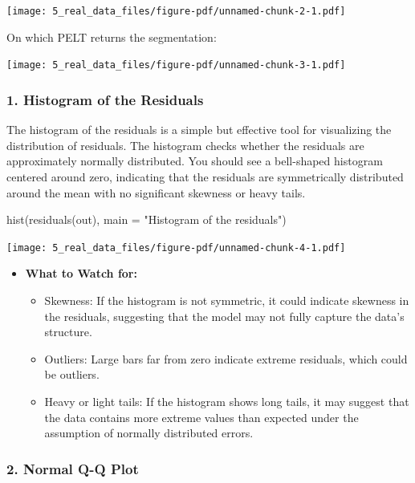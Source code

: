 \documentclass[
  letterpaper,
  DIV=11,
  numbers=noendperiod]{scrreprt}
\newenvironment{Shaded}{\begin{snugshade}}{\end{snugshade}}
\newcommand{\AttributeTok}[1]{\textcolor[rgb]{0.40,0.45,0.13}{#1}}
\newcommand{\FunctionTok}[1]{\textcolor[rgb]{0.28,0.35,0.67}{#1}}
\newcommand{\NormalTok}[1]{\textcolor[rgb]{0.00,0.23,0.31}{#1}}
\newcommand{\StringTok}[1]{\textcolor[rgb]{0.13,0.47,0.30}{#1}}
\providecommand{\tightlist}{%
  \setlength{\itemsep}{0pt}\setlength{\parskip}{0pt}}\usepackage{longtable,booktabs,array}
\begin{document}
\texttt{[image: 5\_real\_data\_files/figure-pdf/unnamed-chunk-2-1.pdf]}

On which PELT returns the segmentation:

\texttt{[image: 5\_real\_data\_files/figure-pdf/unnamed-chunk-3-1.pdf]}

\subsubsection{1. Histogram of the
Residuals}\label{histogram-of-the-residuals}

The histogram of the residuals is a simple but effective tool for
visualizing the distribution of residuals. The histogram checks whether
the residuals are approximately normally distributed. You should see a
bell-shaped histogram centered around zero, indicating that the
residuals are symmetrically distributed around the mean with no
significant skewness or heavy tails.

\begin{Shaded}
\begin{Highlighting}[]
\FunctionTok{hist}\NormalTok{(}\FunctionTok{residuals}\NormalTok{(out), }\AttributeTok{main =} \StringTok{"Histogram of the residuals"}\NormalTok{)}
\end{Highlighting}
\end{Shaded}

\texttt{[image: 5\_real\_data\_files/figure-pdf/unnamed-chunk-4-1.pdf]}

\begin{itemize}
\tightlist
\item
  \textbf{What to Watch for:}

  \begin{itemize}
  \tightlist
  \item
    Skewness: If the histogram is not symmetric, it could indicate
    skewness in the residuals, suggesting that the model may not fully
    capture the data's structure.
  \item
    Outliers: Large bars far from zero indicate extreme residuals, which
    could be outliers.
  \item
    Heavy or light tails: If the histogram shows long tails, it may
    suggest that the data contains more extreme values than expected
    under the assumption of normally distributed errors.
  \end{itemize}
\end{itemize}

\subsubsection{\texorpdfstring{2. \textbf{Normal Q-Q
Plot}}{2. Normal Q-Q Plot}}\label{normal-q-q-plot}
\end{document}
